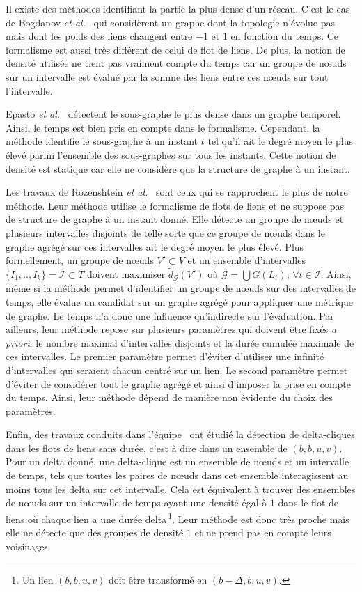 Il existe des méthodes identifiant la partie la plus dense d'un réseau.
C'est le cas de Bogdanov \emph{et al.}~\cite{Bogdanov2011} qui considèrent un graphe dont la topologie n'évolue pas mais dont les poids des liens changent entre $-1$ et $1$ en fonction du temps.
Ce formalisme est aussi très différent de celui de flot de liens.
De plus, la notion de densité utilisée ne tient pas vraiment compte du temps car un groupe de n\oe{}uds sur un intervalle est évalué par la somme des liens entre ces n\oe{}uds sur tout l'intervalle.


Epasto \emph{et al.}~\cite{Epasto2015} détectent le sous-graphe le plus dense dans un graphe temporel.
Ainsi, le temps est bien pris en compte dans le formalisme.
Cependant, la méthode identifie le sous-graphe à un instant $t$ tel qu'il ait le degré moyen le plus élevé parmi l'ensemble des sous-graphes sur tous les instants.
Cette notion de densité est statique car elle ne considère que la structure de graphe à un instant.


Les travaux de Rozenshtein \emph{et al.}~\cite{rozenshtein2014} sont ceux qui se rapprochent le plus de notre méthode.
Leur méthode utilise le formalisme de flots de liens et ne suppose pas de structure de graphe à un instant donné.
Elle détecte un groupe de n\oe{}uds et plusieurs intervalles disjoints de telle sorte que ce groupe de n\oe{}uds dans le graphe agrégé sur ces intervalles ait le degré moyen le plus élevé.
Plus formellement, un groupe de n\oe{}uds $V'\subset V$ et un ensemble d'intervalles $\{I_1,..,I_k\} = \mathcal{I} \subset T$ doivent maximiser $\tilde{d}_\mathcal{G}(V')$ où $\mathcal{G}= \bigcup G(L_t),\,\forall t \in \mathcal{I}$.
Ainsi, même si la méthode permet d'identifier un groupe de n\oe{}uds sur des intervalles de temps, elle évalue un candidat sur un graphe agrégé pour appliquer une métrique de graphe.
Le temps n'a donc une influence qu'indirecte sur l'évaluation.
Par ailleurs, leur méthode repose sur plusieurs paramètres qui doivent être fixés \emph{a priori}: le nombre maximal d'intervalles disjoints et la durée cumulée maximale de ces intervalles.
Le premier paramètre permet d'éviter d'utiliser une infinité d'intervalles qui seraient chacun centré sur un lien.
Le second paramètre permet d'éviter de considérer tout le graphe agrégé et ainsi d'imposer la prise en compte du temps.
Ainsi, leur méthode dépend de manière non évidente du choix des paramètres.

Enfin, des travaux conduits dans l'équipe~\cite{viard:hal-01208330,Viard2016} ont étudié la détection de delta-cliques dans les flots de liens sans durée, c'est à dire dans un ensemble de $(b,b,u,v)$.
Pour un delta donné, une delta-clique est un ensemble de n\oe{}uds et un intervalle de temps, tels que toutes les paires de n\oe{}uds dans cet ensemble interagissent au moins tous les delta sur cet intervalle.
Cela est équivalent à trouver des ensembles de n\oe{}uds sur un intervalle de temps ayant une densité égal à $1$ dans le flot de liens où chaque lien a une durée delta\,\footnote{Un lien $(b,b,u,v)$ doit être transformé en $(b-\Delta,b,u,v)$.}.
Leur méthode est donc très proche mais elle ne détecte que des groupes de densité $1$ et ne prend pas en compte leurs voisinages.


